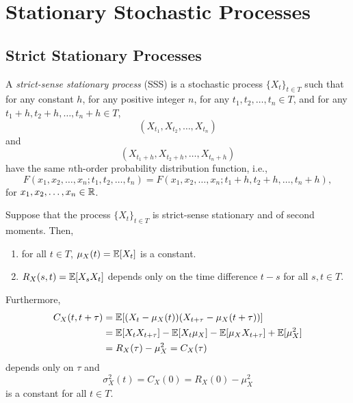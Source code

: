 \chapter{Stationary Stochastic Processes}

\section{Strict Stationary Processes}

\begin{definition}
  A \emph{strict-sense stationary process} (SSS) is a stochastic process \(\{X_t\}_{t \in T}\) such that for any constant \(h\), for any positive integer \(n\), for any \(t_1, t_2, \dots, t_n \in T\), and for any \(t_1 + h, t_2 + h, \dots, t_n + h \in T\),
  \[
    (X_{t_1}, X_{t_2}, \dots, X_{t_n})
  \]
  and
  \[
    (X_{t_1 + h}, X_{t_2 + h}, \dots, X_{t_n + h})
  \]
  have the same \(n\)th-order probability distribution function, i.e.,
  \[
    F(x_1, x_2, \dots, x_n; t_1, t_2, \dots, t_n) = F(x_1, x_2, \dots, x_n; t_1 + h, t_2 + h, \dots, t_n + h),
  \]
  for \(x_1, x_2, \dots, x_n \in \mathbb{R}\).
\end{definition}

\begin{theorem}
  Suppose that the process \(\{X_t\}_{t \in T}\) is strict-sense stationary and of second moments. Then,
  \begin{enumerate}
    \item for all \(t \in T\), \(\mu_X(t) = \mathbb{E}[X_t]\) is a constant.
    \item \(R_X(s, t) = \mathbb{E}[X_s X_t]\) depends only on the time difference \(t - s\) for all \(s, t \in T\).
  \end{enumerate}
\end{theorem}

Furthermore,
\begin{align*}
  C_X(t, t + \tau) &= \mathbb{E}[(X_t - \mu_X(t))(X_{t + \tau} - \mu_X(t + \tau))] \\
  &= \mathbb{E}[X_t X_{t + \tau}] - \mathbb{E}[X_t \mu_X] - \mathbb{E}[\mu_X X_{t + \tau}] + \mathbb{E}[\mu_X^2] \\
  &= R_X(\tau) - \mu_X^2 = C_X(\tau)
\end{align*}
depends only on \(\tau\) and
\[
  \sigma_X^2(t) = C_X(0) = R_X(0) - \mu_X^2
\]
is a constant for all \(t \in T\).

